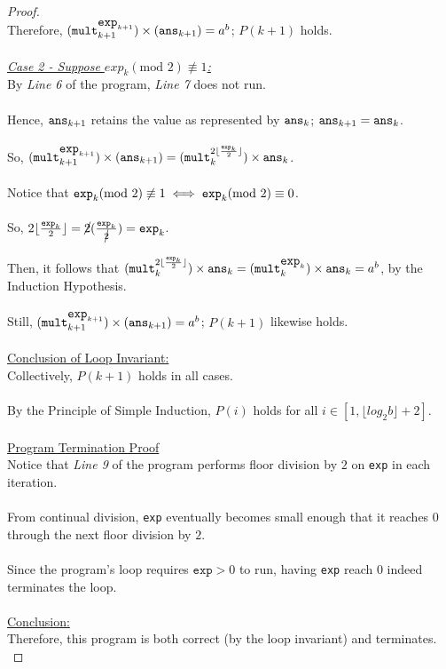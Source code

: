 \documentclass[12pt]{article}
\begin{document}
\begin{proof}
    \\
    Therefore, \((\verb|mult|_{k + 1}^{\verb|exp|_{k + 1}}) \times (\verb|ans|_{k + 1}) = a^b\); $P(k + 1)$ holds. \\
    \\
    \underline{\textit{Case 2 - Suppose \(exp_k (\text{mod } 2) \not\equiv 1\):}} \\
    By \textit{Line 6} of the program, \textit{Line 7} does not run. \\
    \\
    Hence, $\verb|ans|_{k + 1}$ retains the value as represented by $\verb|ans|_k$; \(\verb|ans|_{k + 1} = \verb|ans|_k\). \\
    \\
    So, \((\verb|mult|_{k + 1}^{\verb|exp|_{k + 1}}) \times (\verb|ans|_{k + 1}) = (\verb|mult|_k^{2 \lfloor \frac{\texttt{exp}_k}{2} \rfloor}) \times \verb|ans|_k\). \\
    \\
    Notice that \(\verb|exp|_k (\text{mod } 2) \not\equiv 1 \iff \verb|exp|_k (\text{mod } 2) \equiv 0\). \\
    \\
    So, \(2 \lfloor \frac{\texttt{exp}_k}{2} \rfloor = \cancel{2} (\frac{\texttt{exp}_k}{\cancel{2}}) = \verb|exp|_k\). \\
    \\
    Then, it follows that \((\verb|mult|_k^{2 \lfloor \frac{\texttt{exp}_k}{2} \rfloor}) \times \verb|ans|_k = (\verb|mult|_k^{\verb|exp|_k}) \times \verb|ans|_k = a^b\), by the Induction Hypothesis. \\
    \\
    Still, \((\verb|mult|_{k + 1}^{\verb|exp|_{k + 1}}) \times (\verb|ans|_{k + 1}) = a^b\); $P(k + 1)$ likewise holds. \\
    \\
    \underline{Conclusion of Loop Invariant:} \\
    Collectively, $P(k + 1)$ holds in all cases. \\
    \\
    By the Principle of Simple Induction, $P(i)$ holds for all $i \in [1, \lfloor log_2b \rfloor + 2]$. \\
    \\
    \underline{Program Termination Proof} \\
    Notice that \textit{Line 9} of the program performs floor division by $2$ on \texttt{exp} in each iteration. \\
    \\
    From continual division, \texttt{exp} eventually becomes small enough that it reaches $0$ through the next floor division by $2$. \\
    \\
    Since the program's loop requires $\texttt{exp} > 0$ to run, having \texttt{exp} reach $0$ indeed terminates the loop. \\
    \\
    \underline{Conclusion:} \\
    Therefore, this program is both correct (by the loop invariant) and terminates. \\
\end{proof}
\end{document}
